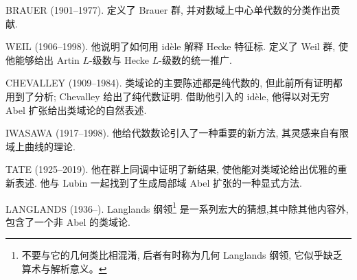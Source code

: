 BRAUER (1901--1977). 定义了 Brauer 群, 并对数域上中心单代数的分类作出贡献.

WEIL (1906--1998). 他说明了如何用 idèle 解释 Hecke 特征标. 定义了 Weil 群, 使他能够给出 Artin $L$-级数与 Hecke $L$-级数的统一推广.

CHEVALLEY (1909--1984). 类域论的主要陈述都是纯代数的, 但此前所有证明都用到了分析; Chevalley 给出了纯代数证明. 借助他引入的 idèle, 他得以对无穷 Abel 扩张给出类域论的自然表述.

IWASAWA (1917--1998). 他给代数数论引入了一种重要的新方法, 其灵感来自有限域上曲线的理论.

TATE (1925--2019). 他在群上同调中证明了新结果, 使他能对类域论给出优雅的重新表述. 他与 Lubin 一起找到了生成局部域 Abel 扩张的一种显式方法.

LANGLANDS (1936--). Langlands 纲领\footnote{不要与它的几何类比相混淆, 后者有时称为几何 Langlands 纲领, 它似乎缺乏算术与解析意义。} 是一系列宏大的猜想,其中除其他内容外, 包含了一个非 Abel 的类域论.
